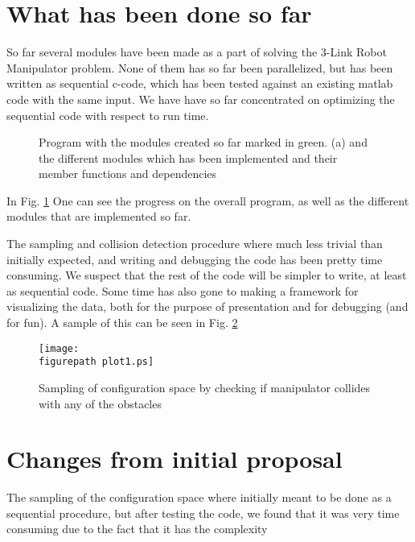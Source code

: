 \newcommand{\figurepath}{./figures/}
\newcommand{\figurescale}{0.22}
\newcommand{\codepath}{../matlab/}
\setlength\parindent{24pt}


\section*{What has been done so far}

So far several modules have been made as a part of solving the 3-Link Robot Manipulator problem. None of them has so far been parallelized, but has been written as sequential c-code, which has been tested against an existing matlab code with the same input. We have have so far concentrated on optimizing the sequential code with respect to run time. 

\begin{figure}[h!] 
 \center 
 \caption{  Program with the modules created so far marked in green. (a) and the different modules which has been implemented and their member functions and dependencies \label{fig:prog1}}
 \end{figure}

In Fig. \ref{fig:prog1} One can see the progress on the overall program, as well as the different modules that are implemented so far. 

The sampling and collision detection procedure where much less trivial than initially expected, and writing and debugging the code has been pretty time consuming. We suspect that the rest of the code will be simpler to write, at least as sequential code. Some time has also gone to making a framework for visualizing the data, both for the purpose of presentation and for debugging (and for fun). A sample of this can be seen in Fig. \ref{fig:plot1} 

\begin{figure}[h!] 
 \center 
 \texttt{[image: \\figurepath plot1.ps]}
 \caption{ Sampling of configuration space by checking if manipulator collides with any of the obstacles \label{fig:plot1}}
 \end{figure}


\section*{Changes from initial proposal}

The sampling of the configuration space where initially meant to be done as a sequential procedure, but after testing the code, we found that it was very time consuming due to the fact that  it has the complexity 

